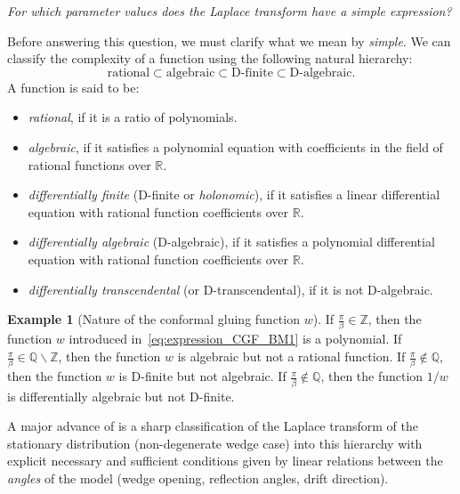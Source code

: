 \documentclass[11pt]{article}
\newcommand\citeS[1]{\cite{#1}}
\newcommand{\beq}{\begin{equation}}
\newcommand{\eeq}{\end{equation}}
\def\RR{\mathbb{R}}
\theoremstyle{definition}
\newtheorem{exe}[thm]{Example}
\begin{document}
\smallskip
{\itshape For which parameter values does the Laplace transform have a simple expression?}

\smallskip
\noindent Before answering this question, we must clarify what we mean by \emph{simple}. We can classify the complexity of a function using the following natural hierarchy:
\beq\label{hierarchy}
\text{rational} \subset \text{algebraic} \subset \text{D-finite} \subset \text{D-algebraic}.
\eeq
A function is said to be:
\begin{itemize}
\item \emph{rational}, if it is a ratio of polynomials.
\item \emph{algebraic}, if it satisfies a polynomial equation with coefficients in the field of rational functions over $\RR$.
\item \emph{differentially finite} (D-finite or \emph{holonomic}), if it satisfies a linear differential equation with rational function coefficients over $\RR$.
\item \emph{differentially algebraic} (D-algebraic), if it satisfies a polynomial differential equation with rational function coefficients over $\RR$.
\item \emph{differentially transcendental} (or D-transcendental), if it is not D-algebraic.
\end{itemize}

\begin{exe}[Nature of the conformal gluing function $w$]
\label{exemple:naturew}
If \( \frac{\pi}{\beta} \in \mathbb{Z} \), then the function \( w \) introduced in~\eqref{eq:expression_CGF_BM1} is a polynomial.  
If \( \frac{\pi}{\beta} \in \mathbb{Q} \backslash \mathbb{Z} \), then the function \( w \) is algebraic but not a rational function.  
If \( \frac{\pi}{\beta} \notin \mathbb{Q} \), then the function \( w \) is D-finite but not algebraic. If \( \frac{\pi}{\beta} \notin \mathbb{Q} \), then the function \( 1/w \) is differentially algebraic but not D-finite.
\end{exe}

A major advance of \cite{franceschi_bousquet_melou_price_hardouin_raschel_stationary_2023} is a sharp classification of the Laplace transform of the stationary distribution (non-degenerate wedge case) into this hierarchy
with explicit necessary and sufficient conditions given by linear relations between the \emph{angles} of the model (wedge opening, reflection angles, drift direction).
\end{document}
